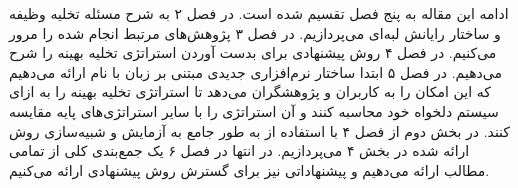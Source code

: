 ادامه این مقاله به پنج فصل تقسیم شده است. در فصل ۲ به شرح مسئله تخلیه وظیفه و ساختار رایانش لبه‌ای می‌پردازیم. در فصل ۳ پژوهش‌های مرتبط انجام شده را مرور می‌کنیم. در فصل ۴ روش پیشنهادی برای بدست آوردن استراتژی تخلیه بهینه را شرح می‌دهیم. در فصل ۵ ابتدا ساختار نرم‌افزاری جدیدی مبتنی بر زبان  با نام  ارائه می‌دهیم که این امکان را به کاربران و پژوهشگران می‌دهد تا استراتژی تخلیه بهینه را به ازای سیستم دلخواه خود محاسبه کنند و آن استراتژی را با سایر استراتژی‌های پایه مقایسه کنند. در بخش دوم از فصل ۴ با استفاده از  به طور جامع به آزمایش و شبیه‌سازی روش ارائه شده در بخش ۴ می‌پردازیم. در انتها در فصل ۶ یک جمع‌بندی کلی از تمامی مطالب ارائه می‌دهیم و پیشنهاداتی نیز برای گسترش روش پیشنهادی ارائه می‌کنیم.


\clearpage
